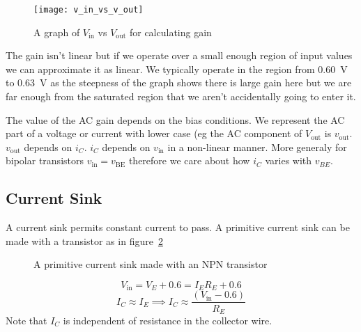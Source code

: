 \documentclass{article}
\begin{document}
    \begin{figure}[ht]
        \centering
        \texttt{[image: v\_in\_vs\_v\_out]}
        \caption{A graph of \(V_\text{in}\) vs \(V_\text{out}\) for calculating gain}
        \label{fig:v_in-v_out graph}
    \end{figure}

    The gain isn't linear but if we operate over a small enough region of input values we can approximate it as linear.
    We typically operate in the region from \SI{0.60}{V} to \SI{0.63}{V} as the steepness of the graph shows there is large gain here but we are far enough from the saturated region that we aren't accidentally going to enter it.
    
    The value of the AC gain depends on the bias conditions. We represent the AC part of a voltage or current with lower case (eg the AC component of \(V_\text{out}\) is \(v_\text{out}\). \(v_\text{out}\) depends on \(i_C\). \(i_C\) depends on \(v_\text{in}\) in a non-linear manner. More generaly for bipolar transistors \(v_\text{in} = v_\text{BE}\) therefore we care about how \(i_C\) varies with \(v_{BE}\).
    
    \subsection{Current Sink}
    A current sink permits constant current to pass. A primitive current sink can be made with a transistor as in figure~\ref{fig:primitive current sink}
    
    \begin{figure}[ht]
        \centering
        \caption{A primitive current sink made with an NPN transistor}
        \label{fig:primitive current sink}
    \end{figure}

    \[V_\text{in} = V_E + 0.6 = I_ER_E + 0.6\]
    \[I_C\approx I_E\implies I_C\approx \frac{(V_\text{in} - 0.6)}{R_E}\]
    Note that \(I_C\) is independent of resistance in the collector wire.
    
\end{document}
